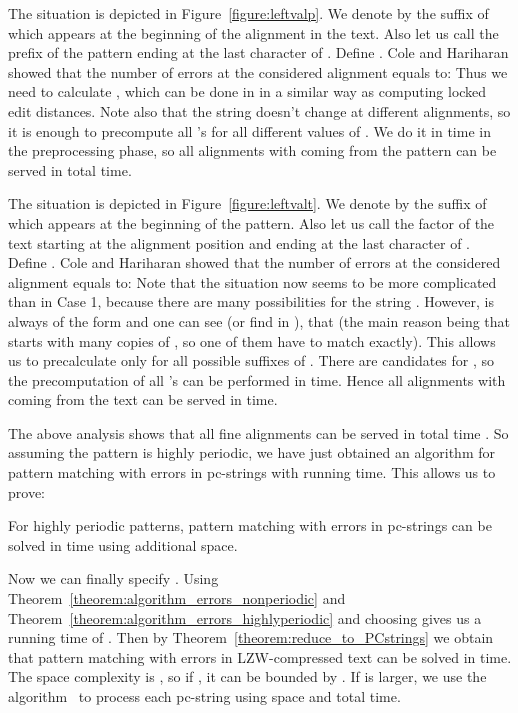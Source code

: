 \documentclass[runningheads]{llncs}
\begin{document}
\begin{mycases}
\item{The situation is depicted in Figure~\ref{figure:leftvalp}. We denote by  the suffix of  which appears at the beginning of the alignment in the text. Also let us call  the prefix of the pattern ending at the last character of . Define . Cole and Hariharan showed that the number of errors at the considered alignment equals to: 
Thus we need to calculate , which can be done in  in a similar way as computing locked edit distances. Note also that the string  doesn't change at different alignments, so it is enough to precompute all 's for all  different values of . We do it in  time in the preprocessing phase, so all alignments with  coming from the pattern can be served in  total time. 
 
 }
\item{The situation is depicted in Figure~\ref{figure:leftvalt}. We denote by  the suffix of  which appears at the beginning of the pattern. Also let us call  the factor of the text starting at the alignment position and ending at the last character of . Define . Cole and Hariharan showed that the number of errors at the considered alignment equals to:   
Note that the situation now seems to be more complicated than in Case 1, because there are many possibilities for the string . However,  is always of the form  and one can see (or find in \cite{ColeHariharan}), that  (the main reason being that  starts with many copies of , so one of them have to match exactly). This allows us to precalculate only  for all possible suffixes  of . There are  candidates for , so the precomputation of all 's can be performed in  time. Hence all alignments with  coming from the text can be served in  time.

}
\end{mycases}

The above analysis shows that all fine alignments can be served in total time . So assuming the pattern is highly periodic, we have just obtained an algorithm for pattern matching with  errors in pc-strings with  running time. This allows us to prove:

\begin{theorem}\label{theorem:algorithm_errors_highlyperiodic}
For highly periodic patterns, pattern matching with  errors in pc-strings can be solved in  time using  additional space.
\end{theorem}

Now we can finally specify . Using Theorem~\ref{theorem:algorithm_errors_nonperiodic} and Theorem~\ref{theorem:algorithm_errors_highlyperiodic} and choosing  gives us a running time of . Then by Theorem~\ref{theorem:reduce_to_PCstrings} we obtain that pattern matching with  errors in LZW-compressed text can be solved in  time. The space complexity is , so if , it can be bounded by . If  is larger, we use the  algorithm~\cite{Landau} to process each pc-string using  space and  total time.
\end{document}
